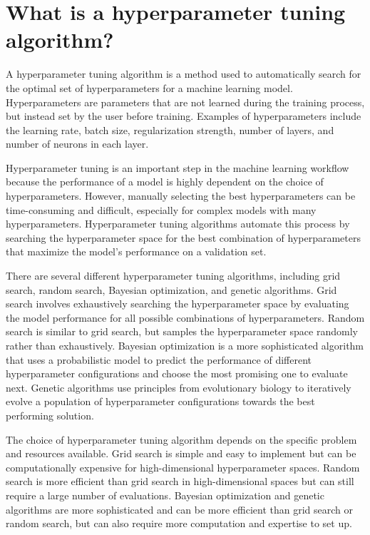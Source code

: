 \section{What is a hyperparameter tuning algorithm?}
A hyperparameter tuning algorithm is a method used to automatically search for the optimal set of hyperparameters for a machine learning model. Hyperparameters are parameters that are not learned during the training process, but instead set by the user before training. Examples of hyperparameters include the learning rate, batch size, regularization strength, number of layers, and number of neurons in each layer.

Hyperparameter tuning is an important step in the machine learning workflow because the performance of a model is highly dependent on the choice of hyperparameters. However, manually selecting the best hyperparameters can be time-consuming and difficult, especially for complex models with many hyperparameters. Hyperparameter tuning algorithms automate this process by searching the hyperparameter space for the best combination of hyperparameters that maximize the model's performance on a validation set.

There are several different hyperparameter tuning algorithms, including grid search, random search, Bayesian optimization, and genetic algorithms. Grid search involves exhaustively searching the hyperparameter space by evaluating the model performance for all possible combinations of hyperparameters. Random search is similar to grid search, but samples the hyperparameter space randomly rather than exhaustively. Bayesian optimization is a more sophisticated algorithm that uses a probabilistic model to predict the performance of different hyperparameter configurations and choose the most promising one to evaluate next. Genetic algorithms use principles from evolutionary biology to iteratively evolve a population of hyperparameter configurations towards the best performing solution.

The choice of hyperparameter tuning algorithm depends on the specific problem and resources available. Grid search is simple and easy to implement but can be computationally expensive for high-dimensional hyperparameter spaces. Random search is more efficient than grid search in high-dimensional spaces but can still require a large number of evaluations. Bayesian optimization and genetic algorithms are more sophisticated and can be more efficient than grid search or random search, but can also require more computation and expertise to set up.


